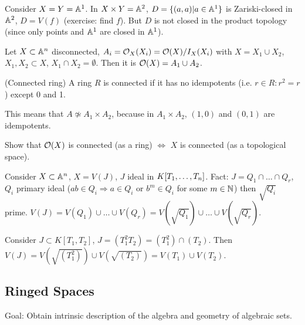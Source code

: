 \documentclass[a4paper,11pt]{article}
\begin{document}
			\begin{eg}
				Consider $X=Y=\AA^1$. In $X\times Y=\AA^2$, $D=\{(a,a)|a\in\AA^1\}$ is Zariski-closed in $\AA^2$, $D=V(f)$ (exercise: find $f$). But $D$ is not closed in the product topology (since only points and $\AA^1$ are closed in $\AA^1$).
			\end{eg}

			\begin{prop}
				Let $X\subset\AA^n$ disconnected, $A_i=\O_X(X_i)=\O(X)/I_X(X_i)$ with $X=X_1\cup X_2$, $X_1,X_2\subset X$, $X_1\cap X_2=\emptyset$. Then it is $\O(X)=A_1\cup A_2$.
			\end{prop}

			\begin{defi}(Connected ring)
				A ring $R$ is connected if it has no idempotents (i.e. $r\in R:r^2=r$) except 0 and 1.
			\end{defi}

			\begin{remark}
				This means that $A\not\simeq A_1\times A_2$, because in $A_1\times A_2$, $(1,0)$ and $(0,1)$ are idempotents.
			\end{remark}

			\begin{exc}
				Show that $\O(X)$ is connected (as a ring) $\Longleftrightarrow$ $X$ is connected (as a topological space).
			\end{exc}

			\begin{eg}
				Consider $X\subset\AA^n$, $X=V(J)$, $J$ ideal in $\K$. Fact: $J=Q_1\cap\dots\cap Q_r$, $Q_i$ primary ideal ($ab\in Q_i\Longrightarrow a\in Q_i$ or $b^m\in Q_i$ for some $m\in\N$) then $\sqrt{Q_i}$ prime. $V(J)=V(Q_1)\cup\dots\cup V(Q_r)=V(\sqrt{Q_1})\cup\dots\cup V(\sqrt{Q_r})$.
			\end{eg}

			\begin{eg}
				Consider $J\subset K[T_1,T_2]$, $J=(T_1^2T_2)=(T_1^2)\cap(T_2)$. Then $V(J)=V(\sqrt{(T_1^2)})\cup V(\sqrt{(T_2)})=V(T_1)\cup V(T_2)$.
			\end{eg}


		\subsection{Ringed Spaces}

			\noindent Goal: Obtain intrinsic description of the algebra and geometry of algebraic sets.
			\\
\end{document}
